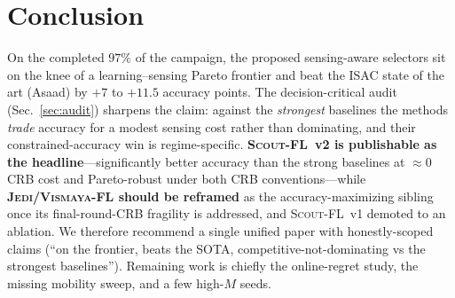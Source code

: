 \documentclass[journal,onecolumn,11pt]{IEEEtran}
\newcommand{\jedi}{\textsc{Jedi/Vismaya-FL}}
\newcommand{\scout}{\textsc{Scout-FL}}
\begin{document}
\begin{table}[t]
  \centering
  \caption{Campaign completion. ``Units'' $=$ (point$\times$method$\times$seed) trainings;
  each is checkpointed and resumable.}
  \label{tab:status}
  \footnotesize
  
\end{table}

\section{Conclusion}
On the completed $97\%$ of the campaign, the proposed sensing-aware selectors sit on the
knee of a learning--sensing Pareto frontier and beat the ISAC state of the art (Asaad) by
$+7$ to $+11.5$ accuracy points. The decision-critical audit (Sec.~\ref{sec:audit})
sharpens the claim: against the \emph{strongest} baselines the methods \emph{trade} accuracy
for a modest sensing cost rather than dominating, and their constrained-accuracy win is
regime-specific. \textbf{\scout{}~v2 is publishable as the headline}---significantly better
accuracy than the strong baselines at $\approx$$0$ CRB cost and Pareto-robust under both CRB
conventions---while \textbf{\jedi{} should be reframed} as the accuracy-maximizing sibling
once its final-round-CRB fragility is addressed, and \scout{}~v1 demoted to an ablation. We
therefore recommend a single unified paper with honestly-scoped claims (``on the frontier,
beats the SOTA, competitive-not-dominating vs the strongest baselines''). Remaining work is
chiefly the online-regret study, the missing mobility sweep, and a few high-$M$ seeds.



\end{document}
